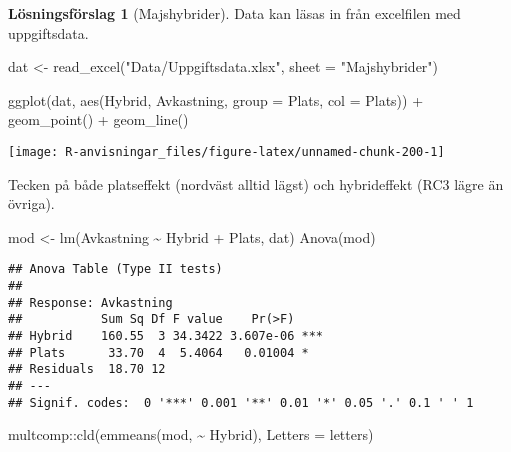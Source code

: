 \documentclass[
]{book}
\newenvironment{Shaded}{\begin{snugshade}}{\end{snugshade}}
\newcommand{\AttributeTok}[1]{\textcolor[rgb]{0.77,0.63,0.00}{#1}}
\newcommand{\FunctionTok}[1]{\textcolor[rgb]{0.00,0.00,0.00}{#1}}
\newcommand{\NormalTok}[1]{#1}
\newcommand{\OtherTok}[1]{\textcolor[rgb]{0.56,0.35,0.01}{#1}}
\newcommand{\SpecialCharTok}[1]{\textcolor[rgb]{0.00,0.00,0.00}{#1}}
\newcommand{\StringTok}[1]{\textcolor[rgb]{0.31,0.60,0.02}{#1}}
\theoremstyle{definition}
\theoremstyle{definition}
\theoremstyle{definition}
\theoremstyle{definition}
\newtheorem{hypothesis}{Lösningsförslag}[chapter]
\theoremstyle{remark}
\begin{document}
\begin{hypothesis}[Majshybrider]
Data kan läsas in från excelfilen med uppgiftsdata.

\begin{Shaded}
\begin{Highlighting}[]
\NormalTok{dat }\OtherTok{\textless{}{-}} \FunctionTok{read\_excel}\NormalTok{(}\StringTok{"Data/Uppgiftsdata.xlsx"}\NormalTok{, }\AttributeTok{sheet =} \StringTok{"Majshybrider"}\NormalTok{)}

\FunctionTok{ggplot}\NormalTok{(dat, }\FunctionTok{aes}\NormalTok{(Hybrid, Avkastning, }\AttributeTok{group =}\NormalTok{ Plats, }\AttributeTok{col =}\NormalTok{ Plats)) }\SpecialCharTok{+}
  \FunctionTok{geom\_point}\NormalTok{() }\SpecialCharTok{+}
  \FunctionTok{geom\_line}\NormalTok{()}
\end{Highlighting}
\end{Shaded}

\begin{center}\texttt{[image: R-anvisningar\_files/figure-latex/unnamed-chunk-200-1]} \end{center}

Tecken på både platseffekt (nordväst alltid lägst) och hybrideffekt (RC3 lägre än övriga).

\begin{Shaded}
\begin{Highlighting}[]
\NormalTok{mod }\OtherTok{\textless{}{-}} \FunctionTok{lm}\NormalTok{(Avkastning }\SpecialCharTok{\textasciitilde{}}\NormalTok{ Hybrid }\SpecialCharTok{+}\NormalTok{ Plats, dat)}
\FunctionTok{Anova}\NormalTok{(mod)}
\end{Highlighting}
\end{Shaded}

\begin{verbatim}
## Anova Table (Type II tests)
## 
## Response: Avkastning
##           Sum Sq Df F value    Pr(>F)    
## Hybrid    160.55  3 34.3422 3.607e-06 ***
## Plats      33.70  4  5.4064   0.01004 *  
## Residuals  18.70 12                      
## ---
## Signif. codes:  0 '***' 0.001 '**' 0.01 '*' 0.05 '.' 0.1 ' ' 1
\end{verbatim}

\begin{Shaded}
\begin{Highlighting}[]
\NormalTok{multcomp}\SpecialCharTok{::}\FunctionTok{cld}\NormalTok{(}\FunctionTok{emmeans}\NormalTok{(mod, }\SpecialCharTok{\textasciitilde{}}\NormalTok{ Hybrid), }\AttributeTok{Letters =}\NormalTok{ letters)}
\end{Highlighting}
\end{Shaded}


\end{hypothesis}
\end{document}
